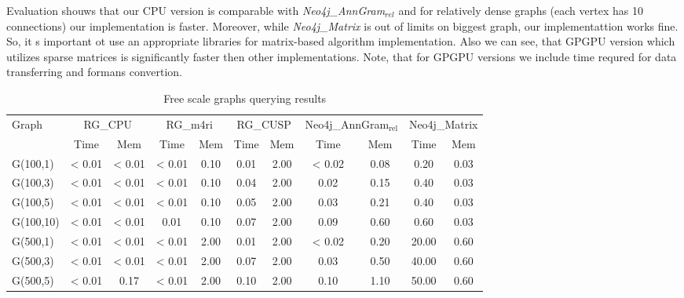 Evaluation shouws that our CPU version is comparable with \textit{Neo4j\_AnnGram$_{\textit{rel}}$} and for relatively dense graphs (each vertex has 10 connections) our implementation is faster. Moreover, while \textit{Neo4j\_Matrix} is out of limits on biggest graph, our implementattion works fine.
So, it s important ot use an appropriate libraries for matrix-based algorithm implementation.
Also we can see, that GPGPU version which utilizes sparse matrices is significantly faster then other implementations.
Note, that for GPGPU versions we include time requred for data transferring and formans convertion.

\begin{table*}
\caption{Free scale graphs querying results}
\label{tbl:tableFreeScale}
\begin{tabular}{| l | c  c | c  c | c  c | c  c | c  c |}
    \hline
    \multirow{2}{*}{Graph} & \multicolumn{2}{|c|}{RG\_CPU} & \multicolumn{2}{|c|}{RG\_m4ri} & \multicolumn{2}{|c|}{RG\_CUSP} &\multicolumn{2}{|c|}{Neo4j\_AnnGram$_{\text{rel}}$} &\multicolumn{2}{|c|}{Neo4j\_Matrix} \\
    \cline{2-11}
                  & Time     & Mem             & Time   & Mem          & Time     & Mem         & Time    & Mem         & Time    & Mem\\
    \hline
    \hline
    G(100,1)      & < 0.01  & < 0.01           & < 0.01  & 0.10        & 0.01   & 2.00          & < 0.02  & 0.08      & 0.20     & 0.03  \\
    G(100,3)      & < 0.01  & < 0.01           & < 0.01  & 0.10        & 0.04   & 2.00          & 0.02    & 0.15      & 0.40     & 0.03  \\
    G(100,5)      & < 0.01  & < 0.01           & < 0.01  & 0.10        & 0.05   & 2.00          & 0.03    & 0.21      & 0.40     & 0.03  \\
    G(100,10)     & < 0.01  & < 0.01           & 0.01    & 0.10        & 0.07   & 2.00          & 0.09    & 0.60      & 0.60     & 0.03  \\
    \hline
    G(500,1)      & < 0.01  & < 0.01           & < 0.01  & 2.00        & 0.01   & 2.00          & < 0.02  & 0.20      & 20.00    & 0.60   \\
    G(500,3)      & < 0.01  & < 0.01           & < 0.01  & 2.00        & 0.07   & 2.00          & 0.03    & 0.50      & 40.00    & 0.60   \\
    G(500,5)      & < 0.01  & 0.17             & < 0.01  & 2.00        & 0.10   & 2.00          & 0.10    & 1.10      & 50.00    & 0.60   \\

\end{tabular}
\end{table*}
